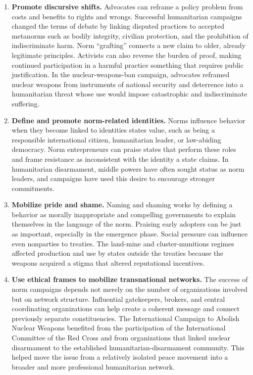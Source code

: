 \begin{enumerate}
    \item \textbf{Promote discursive shifts.} Advocates can reframe a policy problem from costs and benefits to rights and wrongs. Successful humanitarian campaigns changed the terms of debate by linking disputed practices to accepted metanorms such as bodily integrity, civilian protection, and the prohibition of indiscriminate harm. Norm ``grafting'' connects a new claim to older, already legitimate principles. Activists can also reverse the burden of proof, making continued participation in a harmful practice something that requires public justification. In the nuclear-weapons-ban campaign, advocates reframed nuclear weapons from instruments of national security and deterrence into a humanitarian threat whose use would impose catastrophic and indiscriminate suffering.

    \item \textbf{Define and promote norm-related identities.} Norms influence behavior when they become linked to identities states value, such as being a responsible international citizen, humanitarian leader, or law-abiding democracy. Norm entrepreneurs can praise states that perform these roles and frame resistance as inconsistent with the identity a state claims. In humanitarian disarmament, middle powers have often sought status as norm leaders, and campaigns have used this desire to encourage stronger commitments.

    \item \textbf{Mobilize pride and shame.} Naming and shaming works by defining a behavior as morally inappropriate and compelling governments to explain themselves in the language of the norm. Praising early adopters can be just as important, especially in the emergence phase. Social pressure can influence even nonparties to treaties. The land-mine and cluster-munitions regimes affected production and use by states outside the treaties because the weapons acquired a stigma that altered reputational incentives.

    \item \textbf{Use ethical frames to mobilize transnational networks.} The success of norm campaigns depends not merely on the number of organizations involved but on network structure. Influential gatekeepers, brokers, and central coordinating organizations can help create a coherent message and connect previously separate constituencies. The International Campaign to Abolish Nuclear Weapons benefited from the participation of the International Committee of the Red Cross and from organizations that linked nuclear disarmament to the established humanitarian-disarmament community. This helped move the issue from a relatively isolated peace movement into a broader and more professional humanitarian network.


\end{enumerate}
